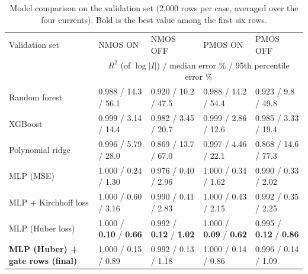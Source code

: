 \documentclass[10pt,a4paper]{article}
\newcommand{\best}[1]{\textbf{#1}}
\begin{document}
\begin{table}[H]
\centering\scriptsize
\setlength{\tabcolsep}{4pt}
\begin{tabularx}{\linewidth}{@{}lXXXX@{}}
\toprule
Validation set & NMOS ON & NMOS OFF & PMOS ON & PMOS OFF\\
 & \multicolumn{4}{c}{$R^2$ (of $\log|I|$) / median error \% / 95th percentile error \%}\\
\midrule
Random forest & 0.988 / 14.3 / 56.1 & 0.920 / 10.2 / 47.5 & 0.988 / 14.2 / 54.4 & 0.923 / 9.8 / 49.8\\
XGBoost & 0.999 / 3.14 / 14.4 & 0.982 / 3.45 / 20.7 & 0.999 / 2.86 / 12.6 & 0.985 / 3.33 / 19.4\\
Polynomial ridge & 0.996 / 5.79 / 28.0 & 0.869 / 13.7 / 67.0 & 0.997 / 4.46 / 22.1 & 0.868 / 14.6 / 77.3\\
MLP (MSE) & 1.000 / 0.24 / 1.30 & 0.976 / 0.40 / 2.96 & 1.000 / 0.34 / 1.62 & 0.990 / 0.33 / 2.02\\
MLP + Kirchhoff loss & 1.000 / 0.60 / 3.16 & 0.990 / 0.41 / 2.83 & 1.000 / 0.43 / 2.15 & 0.992 / 0.35 / 2.25\\
MLP (Huber loss) & 1.000 / \best{0.10} / \best{0.66} & 0.992 / \best{0.12} / \best{1.02} & 1.000 / \best{0.09} / \best{0.62} & 0.995 / \best{0.12} / \best{0.86}\\
\midrule
\best{MLP (Huber) + gate rows (final)} & 1.000 / 0.15 / 0.89 & 0.992 / 0.13 / 1.18 & 1.000 / 0.14 / 0.86 & 0.996 / 0.14 / 1.09\\
\bottomrule
\end{tabularx}
\caption{Model comparison on the validation set (2,000 rows per case, averaged over the four currents). Bold is the best value among the first six rows.}\label{tab:compare}
\end{table}
\end{document}
